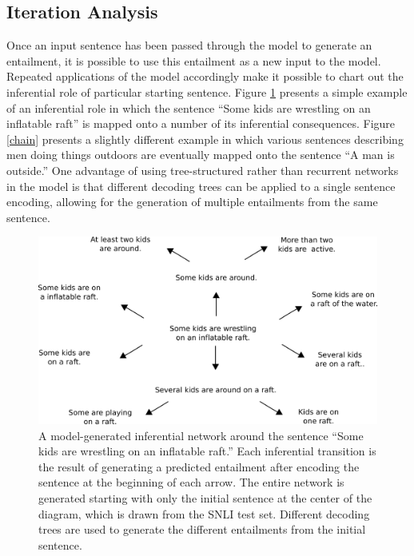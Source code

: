 \documentclass[utf8]{frontiersSCNS} %
\begin{document}
\subsection{Iteration Analysis}\label{sec:iteration}

Once an input sentence has been passed through the model to generate an entailment, it is possible to use this entailment as a new input to the model. Repeated applications of the model accordingly make it possible to chart out the inferential role of particular starting sentence. Figure \ref{inf-gen} presents a simple example of an inferential role in which the sentence ``Some kids are wrestling on an inflatable raft'' is mapped onto a number of its inferential consequences. Figure \ref{chain} presents a slightly different example in which various sentences describing men doing things outdoors are eventually mapped onto the sentence ``A man is outside.'' One advantage of using tree-structured rather than recurrent networks in the model is that different decoding trees can be applied to a single sentence encoding, allowing for the generation of multiple entailments from the same sentence.

\begin{figure}[t]
\begin{center}
\includegraphics[width=5in]{figures/outward-inf-gen.png}
\end{center}
\caption{A model-generated inferential network around the sentence ``Some kids are wrestling on an inflatable raft.'' Each inferential transition is the result of generating a predicted entailment after encoding the sentence at the beginning of each arrow. The entire network is generated starting with only the initial sentence at the center of the diagram, which is drawn from the SNLI test set. Different decoding trees are used to generate the different entailments from the initial sentence.} 
\label{inf-gen}
\end{figure}
\end{document}
